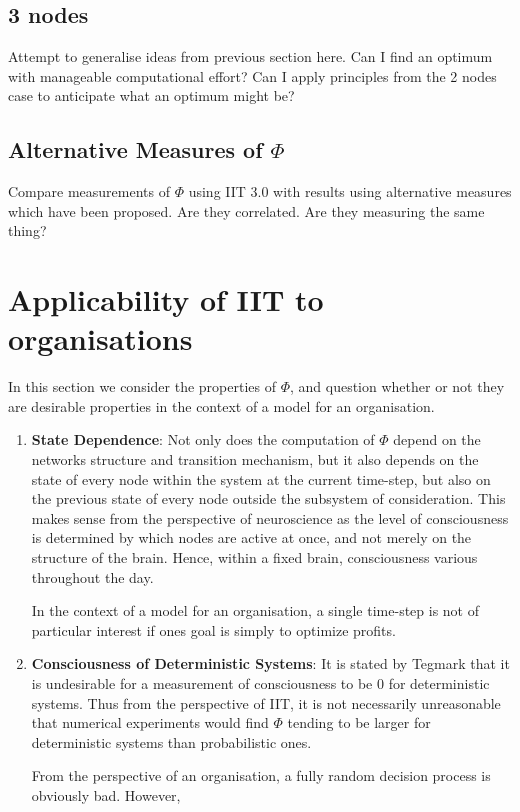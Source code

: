 \subsection{3 nodes}
Attempt to generalise ideas from previous section here. Can I find an optimum with manageable computational effort? Can I apply principles from the 2 nodes case to anticipate what an optimum might be?

\subsection{Alternative Measures of $\Phi$}
Compare measurements of $\Phi$ using IIT 3.0 with results using alternative measures which have been proposed. Are they correlated. Are they measuring the same thing?

\section{Applicability of IIT to organisations}
In this section we consider the properties of $\Phi$, and question whether or not they are desirable properties in the context of a model for an organisation.

\begin{enumerate}
	\item \textbf{State Dependence}: Not only does the computation of $\Phi$ depend on the networks structure and transition mechanism, but it also depends on the state of every node within the system at the current time-step, but also on the previous state of every node outside the subsystem of consideration. This makes sense from the perspective of neuroscience as the level of consciousness is determined by which nodes are active at once, and not merely on the structure of the brain. Hence, within a fixed brain, consciousness various throughout the day. 
	
	In the context of a model for an organisation, a single time-step is not of particular interest if ones goal is simply to optimize profits. 
	
	
	\item \textbf{Consciousness of Deterministic Systems}: It is stated by Tegmark \cite{improvedIIT} that it is undesirable for a measurement of consciousness to be 0 for deterministic systems. Thus from the perspective of IIT, it is not necessarily unreasonable that numerical experiments would find $\Phi$ tending to be larger for deterministic systems than probabilistic ones.
	
	From the perspective of an organisation, a fully random decision process is obviously bad. However, 
\end{enumerate}